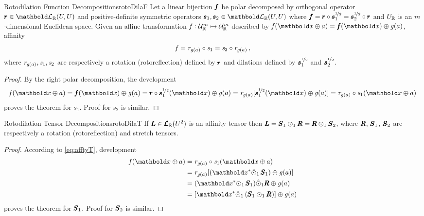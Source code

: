\begin{mteo}{Rotodilation Function Decompositions}{rotoDilaF}
Let a linear bijection $\vtf{f}$ be polar decomposed by orthogonal operator $\vtf{r}\in\evl{\real}{U}{U}$ and positive-definite symmetric operators $\vtf{s}_1,\vtf{s}_2\in\evl{\real}{U}{U}$ where $\vtf{f}=\vtf{r}\circ\vtf{s}_1^{\nicefrac{1}{2}}=\vtf{s}_2^{\nicefrac{1}{2}}\circ\vtf{r}$ and $U_\real$ is an $m$-dimensional Euclidean space. Given an affine transformation $\map{\mathit{f}}{\eamd{U}{R}{m}}{\eamd{U}{R}{m}}$ described by $\fua{\mathit{f}}{\vto{x}\oplus a}=\fua{\vtf{f}}{\vto{x}}\oplus\fua{\mathit{g}}{a}$, affinity
\begin{equation*}
\mathit{f} = \mathit{r}_{\fua{\mathit{g}}{a}}\circ\mathit{s}_1=\mathit{s}_2\circ\mathit{r}_{\fua{\mathit{g}}{a}}\,,
\end{equation*}
where $\mathit{r}_{\fua{\mathit{g}}{a}},\mathit{s}_1,\mathit{s}_2$ are respectively a rotation (rotoreflection) defined by $\vtf{r}$ and dilations defined by $\vtf{s}_1^{\nicefrac{1}{2}}$ and $\vtf{s}_2^{\nicefrac{1}{2}}$.  
\end{mteo}

{\footnotesize
\begin{proof}
By the right polar decomposition, the development 
\begin{equation*}
\fua{\mathit{f}}{\vto{x}\oplus a}=\fua{\vtf{f}}{\vto{x}}\oplus \fua{\mathit{g}}{a}=\fua{\vtf{r}\circ\vtf{s}_1^{\nicefrac{1}{2}}}{\vto{x}}\oplus \fua{\mathit{g}}{a}=\mathit{r}_{\fua{\mathit{g}}{a}}[\fua{\vtf{s}_1^{\nicefrac{1}{2}}}{\vto{x}}\oplus \fua{\mathit{g}}{a}]=\mathit{r}_{\fua{\mathit{g}}{a}}\circ\mathit{s}_1(\vto{x}\oplus a) 
\end{equation*}
proves the theorem for $\mathit{s}_1$. Proof for $\mathit{s}_2$ is similar.
\end{proof}}


\begin{mcoro}{Rotodilation Tensor Decompositions}{rotoDilaT}
If $\tnr{L}\in\ete{\cam{R}}{U^2}$ is an affinity tensor then $\tnr{L}=\tnr{S}_1\odot_1\tnr{R}=\tnr{R}\odot_1\tnr{S}_2$, where $\tnr{R}$, $\tnr{S}_1$, $\tnr{S}_2$ are respectively a rotation (rotoreflection) and stretch tensors. 
\end{mcoro}


{\footnotesize
\begin{proof}
According to \eqref{eq:afftyT}, development
\begin{align*}
\fua{\mathit{f}}{\vto{x}\oplus a}&=\mathit{r}_{\fua{\mathit{g}}{a}}\circ\mathit{s}_1(\vto{x}\oplus a)\\
&=\mathit{r}_{\fua{\mathit{g}}{a}}[(\vto{x}^*\hat{\odot}_1\,\tnr{S}_1)\oplus{\fua{\mathit{g}}{a}}]\\
&=(\vto{x}^*{\odot_1}\,\tnr{S}_1)\hat{\odot}_1\tnr{R}\oplus{\fua{\mathit{g}}{a}}\\
&=[\vto{x}^*{\hat{\odot}_1}\,(\tnr{S}_1\odot_1\tnr{R})]\oplus{\fua{\mathit{g}}{a}}
\end{align*}
proves the theorem for $\tnr{S}_1$. Proof for $\tnr{S}_2$ is similar.
\end{proof}}



